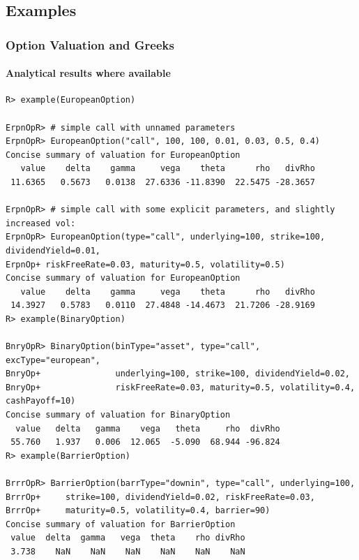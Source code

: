 \documentclass[compress]{beamer}
\begin{document}
\subsection{Examples}
\begin{frame}[fragile]
  \frametitle{Option Valuation and Greeks}
  \framesubtitle{Analytical results where available}
  \tiny   
\begin{verbatim}
R> example(EuropeanOption)

ErpnOpR> # simple call with unnamed parameters
ErpnOpR> EuropeanOption("call", 100, 100, 0.01, 0.03, 0.5, 0.4)
Concise summary of valuation for EuropeanOption 
   value    delta    gamma     vega    theta      rho   divRho 
 11.6365   0.5673   0.0138  27.6336 -11.8390  22.5475 -28.3657 

ErpnOpR> # simple call with some explicit parameters, and slightly increased vol:
ErpnOpR> EuropeanOption(type="call", underlying=100, strike=100, dividendYield=0.01, 
ErpnOp+ riskFreeRate=0.03, maturity=0.5, volatility=0.5)
Concise summary of valuation for EuropeanOption 
   value    delta    gamma     vega    theta      rho   divRho 
 14.3927   0.5783   0.0110  27.4848 -14.4673  21.7206 -28.9169 
R> example(BinaryOption)

BnryOpR> BinaryOption(binType="asset", type="call", excType="european",
BnryOp+               underlying=100, strike=100, dividendYield=0.02,
BnryOp+               riskFreeRate=0.03, maturity=0.5, volatility=0.4, cashPayoff=10)
Concise summary of valuation for BinaryOption 
  value   delta   gamma    vega   theta     rho  divRho 
 55.760   1.937   0.006  12.065  -5.090  68.944 -96.824 
R> example(BarrierOption)

BrrrOpR> BarrierOption(barrType="downin", type="call", underlying=100,
BrrrOp+ 	strike=100, dividendYield=0.02, riskFreeRate=0.03,
BrrrOp+ 	maturity=0.5, volatility=0.4, barrier=90)
Concise summary of valuation for BarrierOption 
 value  delta  gamma   vega  theta    rho divRho 
 3.738    NaN    NaN    NaN    NaN    NaN    NaN 
 
\end{verbatim}
\end{frame}
\end{document}
